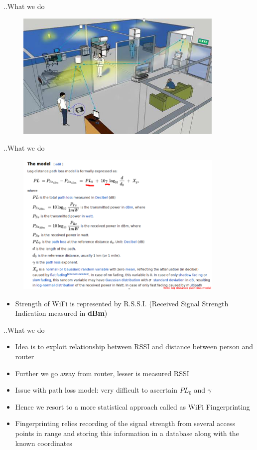 \documentclass{beamer}
\begin{document}
\begin{frame}{..What we do}
\begin{figure} [ht!]
  \includegraphics[width=100mm]{images/indoorpositioning.jpg}
\end{figure}
\vskip 1cm
\end{frame}
\begin{frame}{..What we do}
\begin{figure} [ht!]
  \includegraphics[width=100mm]{images/powerlogmodel.png}
\end{figure}
\begin{itemize}
  \item Strength of WiFi is represented by R.S.S.I. (Received Signal Strength Indication measured in \textbf{dBm})
\end{itemize}
\end{frame}
\begin{frame}{..What we do}
\begin{itemize}
  \item Idea is to exploit relationship between RSSI and distance between person and router
  \item Further we go away from router, lesser is measured RSSI
  \item Issue with path loss model: very difficult to ascertain \( PL_0 \) and \(\gamma\)
  \item Hence we resort to a more statistical approach called as WiFi Fingerprinting
  \item Fingerprinting relies recording of the signal strength from several access points in range and storing this information in a database along with the known coordinates
\end{itemize}
\vskip 1cm
\end{frame}
\end{document}
